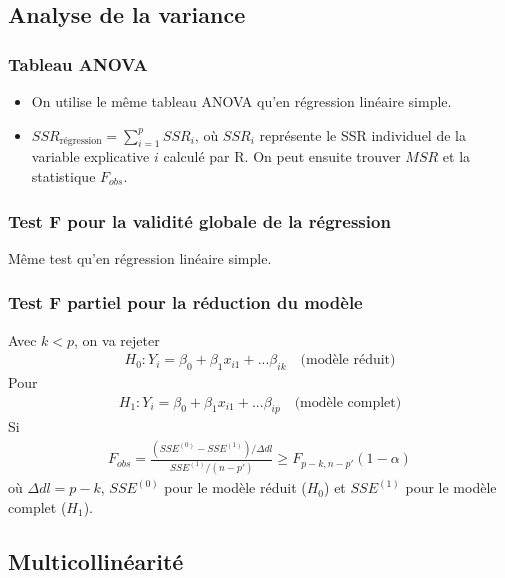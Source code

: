 \documentclass[10pt, french]{article}
\begin{document}
\begin{multicols*}{3}
\subsection*{Analyse de la variance}
\subsubsection*{Tableau ANOVA}
\begin{itemize}
\item On utilise le même tableau ANOVA qu'en régression linéaire simple.
\item $SSR_{\text{régression}} = \sum_{i=1}^{p} SSR_i $, où $SSR_i$ représente le SSR individuel de la variable explicative $i$ calculé par R. On peut ensuite trouver $MSR$ et la statistique $F_{obs}$.
\end{itemize}

\subsubsection*{Test F pour la validité globale de la régression}
Même test qu'en régression linéaire simple.


\subsubsection*{Test F partiel pour la réduction du modèle}
Avec $k < p$, on va rejeter
\begin{align*}
H_0 : Y_i = \beta_0 + \beta_1 x_{i1} + ... \beta_{ik} \quad \text{(modèle réduit)}
\end{align*}
Pour
\begin{align*}
H_1 : Y_i = \beta_0 + \beta_1 x_{i1} + ... \beta_{ip} \quad \text{(modèle complet)}
\end{align*}
Si
\begin{align*}
F_{obs} = \frac{(SSE^{(0)} - SSE^{(1)}) / \Delta dl}{SSE^{(1)} / (n-p')} \geq F_{p-k, n-p'}(1- \alpha)
\end{align*}
où $\Delta dl = p - k$, $SSE^{(0)}$ pour le modèle réduit ($H_0$) et $SSE^{(1)}$ pour le modèle complet ($H_1$).

\subsection*{Multicollinéarité}

\end{multicols*}
\end{document}
